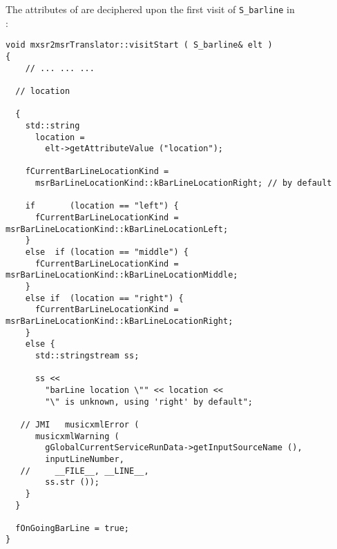 The attributes of  are deciphered upon the first visit of {\tt S_barline} in\\
:%
\begin{lstlisting}[language=CPlusPlus]
void mxsr2msrTranslator::visitStart ( S_barline& elt )
{
	// ... ... ...

  // location

  {
    std::string
      location =
        elt->getAttributeValue ("location");

    fCurrentBarLineLocationKind =
      msrBarLineLocationKind::kBarLineLocationRight; // by default

    if       (location == "left") {
      fCurrentBarLineLocationKind = msrBarLineLocationKind::kBarLineLocationLeft;
    }
    else  if (location == "middle") {
      fCurrentBarLineLocationKind = msrBarLineLocationKind::kBarLineLocationMiddle;
    }
    else if  (location == "right") {
      fCurrentBarLineLocationKind = msrBarLineLocationKind::kBarLineLocationRight;
    }
    else {
      std::stringstream ss;

      ss <<
        "barLine location \"" << location <<
        "\" is unknown, using 'right' by default";

   // JMI   musicxmlError (
      musicxmlWarning (
        gGlobalCurrentServiceRunData->getInputSourceName (),
        inputLineNumber,
   //     __FILE__, __LINE__,
        ss.str ());
    }
  }

  fOnGoingBarLine = true;
}
\end{lstlisting}


